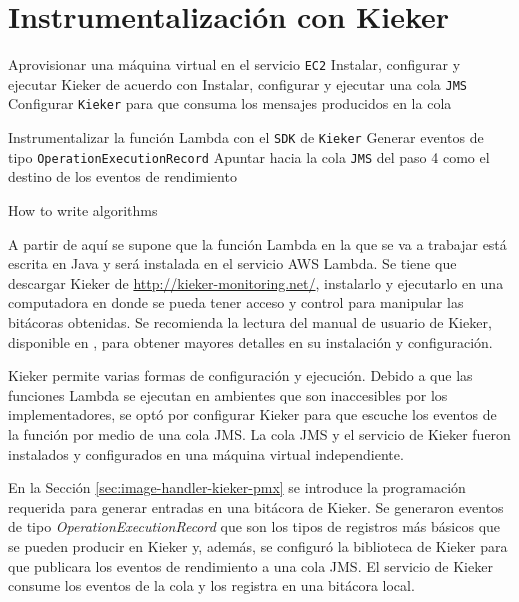 \section{Instrumentalización con Kieker}

\begin{singlespace}
\begin{algorithm}[H]
\SetAlgoLined
Aprovisionar una máquina virtual en el servicio \texttt{EC2}\;
Instalar, configurar y ejecutar Kieker de acuerdo con \cite{kieker-user-guide}\;
Instalar, configurar y ejecutar una cola \texttt{JMS}\;
Configurar \texttt{Kieker} para que consuma los mensajes producidos en la cola\;

Instrumentalizar la función Lambda con el \texttt{SDK} de \texttt{Kieker}\;
Generar eventos de tipo \texttt{OperationExecutionRecord}\;
Apuntar hacia la cola \texttt{JMS} del paso 4 como el destino de los eventos de rendimiento\;

 \caption{How to write algorithms}
\end{algorithm}
\end{singlespace}

A partir de aquí se supone que la función Lambda en la que se va a trabajar está escrita en Java y será instalada en el servicio AWS Lambda. Se tiene que descargar Kieker de \url{http://kieker-monitoring.net/}, instalarlo y ejecutarlo en una computadora en donde se pueda tener acceso y control para manipular las bitácoras obtenidas. Se recomienda la lectura del manual de usuario de Kieker, disponible en \cite{kieker-user-guide}, para obtener mayores detalles en su instalación y configuración.

Kieker permite varias formas de configuración y ejecución. Debido a que las funciones Lambda se ejecutan en ambientes que son inaccesibles por los implementadores, se optó por configurar Kieker para que escuche los eventos de la función por medio de una cola JMS. La cola JMS y el servicio de Kieker fueron instalados y configurados en una máquina virtual independiente.

En la Sección \ref{sec:image-handler-kieker-pmx} se introduce la programación requerida para generar entradas en una bitácora de Kieker. Se generaron eventos de tipo \emph{OperationExecutionRecord} que son los tipos de registros más básicos que se pueden producir en Kieker y, además, se configuró la biblioteca de Kieker para que publicara los eventos de rendimiento a una cola JMS. El servicio de Kieker consume los eventos de la cola y los registra en una bitácora local.


